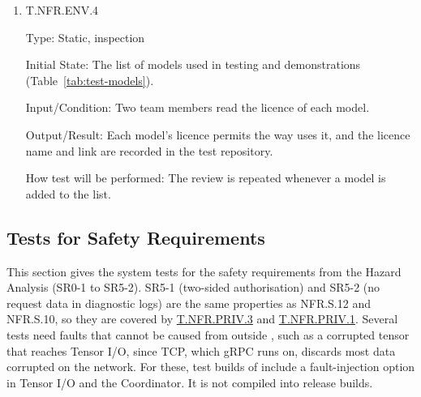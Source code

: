 \documentclass[12pt, titlepage]{article}
\begin{document}
\begin{enumerate}
How test will be performed: \texttt{cargo-deny} \citep{CargoDeny},
\texttt{pip-licenses} \citep{PipLicenses} and \texttt{license-checker}
\citep{LicenseChecker} run in continuous integration and fail the build for
any licence not on the list.

\item{T.NFR.ENV.4\\}
\label{T.NFR.ENV.4}

Type: Static, inspection

Initial State: The list of models used in testing and demonstrations
(Table~\ref{tab:test-models}).

Input/Condition: Two team members read the licence of each model.

Output/Result: Each model's licence permits the way \progname{} uses it, and the
licence name and link are recorded in the test repository.

How test will be performed: The review is repeated whenever a model is added
to the list.

\end{enumerate}

\subsection{Tests for Safety Requirements}
\label{sec:sr-tests}

This section gives the system tests for the safety requirements from the
Hazard Analysis (SR0-1 to SR5-2). SR5-1 (two-sided authorisation) and SR5-2 (no request data in diagnostic logs)
are the same properties as NFR.S.12 and NFR.S.10, so they are covered by
\hyperref[T.NFR.PRIV.3]{T.NFR.PRIV.3} and
\hyperref[T.NFR.PRIV.1]{T.NFR.PRIV.1}. Several tests need faults that cannot be
caused from outside \progname{}, such as a corrupted tensor that reaches
Tensor I/O, since TCP, which gRPC runs on, discards most data corrupted on the
network. For these, test builds of \progname{} include a
fault-injection option in Tensor I/O and the Coordinator. It is not compiled
into release builds.
\end{document}
